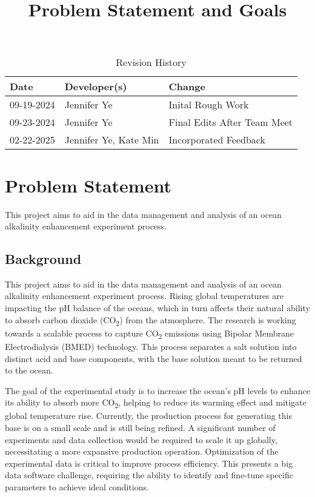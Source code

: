 \documentclass{article}
\title{Problem Statement and Goals\\\progname}
\author{\authname}
\date{}
\begin{document}
\maketitle

\begin{table}[hp]
\caption{Revision History} \label{TblRevisionHistory}
\begin{tabularx}{\textwidth}{llX}
\toprule
\textbf{Date} & \textbf{Developer(s)} & \textbf{Change}\\
\midrule
09-19-2024 & Jennifer Ye & Inital Rough Work \\
09-23-2024 & Jennifer Ye & Final Edits After Team Meet\\
02-22-2025 & Jennifer Ye, Kate Min & Incorporated Feedback\\ 
\bottomrule
\end{tabularx}
\end{table}



\section{Problem Statement}
This project aims to aid in the data management and analysis of an ocean
alkalinity enhancement experiment process.

\subsection{Background}
This project aims to aid in the data management and analysis of an ocean
alkalinity enhancement experiment process. Rising global temperatures are
impacting the pH balance of the oceans, which in turn affects their natural
ability to absorb carbon dioxide (CO\textsubscript{2}) from the atmosphere. The
research is working towards a scalable process to capture CO\textsubscript{2}
emissions using Bipolar Membrane Electrodialysis (BMED) technology. This process
separates a salt solution into distinct acid and base components, with the base
solution meant to be returned to the ocean.

\noindent The goal of the experimental study is to increase the ocean's pH
levels to enhance its ability to absorb more CO\textsubscript{2}, helping to
reduce its warming effect and mitigate global temperature rise. Currently, the
production process for generating this base is on a small scale and is
still being refined. A significant number of experiments and data collection
would be required to scale it up globally, necessitating a more expansive
production operation. Optimization of the experimental data is critical to
improve process efficiency. This presents a big data software challenge,
requiring the ability to identify and fine-tune specific parameters to achieve
ideal conditions.
\end{document}
